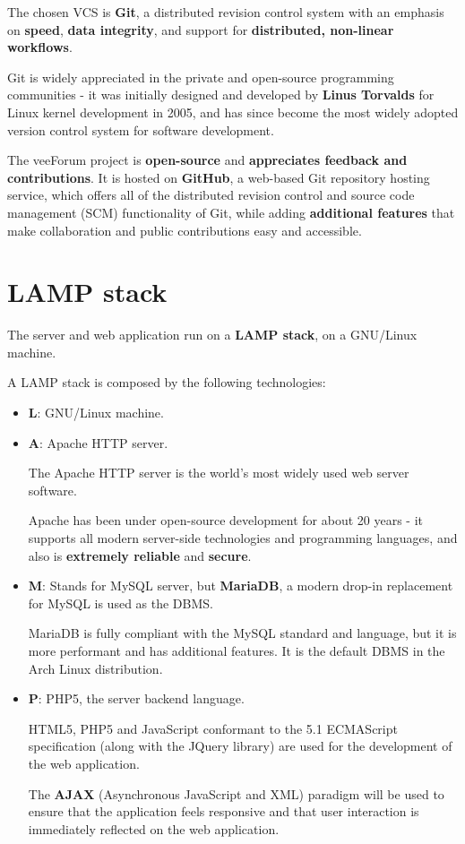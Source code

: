 \documentclass[12pt]{report}
\renewcommand\emph{\textbf}
\begin{document}
                The chosen VCS is \emph{Git}, a distributed revision control system with an emphasis on \emph{speed}, \emph{data integrity}, and support for \emph{distributed, non-linear workflows}.

                Git is widely appreciated in the private and open-source programming communities - it was initially designed and developed by \emph{Linus Torvalds} for Linux kernel development in 2005, and has since become the most widely adopted version control system for software development.

                The veeForum project is \emph{open-source} and \emph{appreciates feedback and contributions}. It is hosted on \emph{GitHub}, a web-based Git repository hosting service, which offers all of the distributed revision control and source code management (SCM) functionality of Git, while adding \emph{additional features} that make collaboration and public contributions easy and accessible.

            \section{LAMP stack}
                The server and web application run on a \emph{LAMP stack}, on a GNU/Linux machine.

                A LAMP stack is composed by the following technologies:

                \begin{itemize}
                    \item \emph{L}: GNU/Linux machine.
                    \item \emph{A}: Apache HTTP server.

                     The Apache HTTP server is the world's most widely used web server software.

                     Apache has been under open-source development for about 20 years - it supports all modern server-side technologies and programming languages, and also is \emph{extremely reliable} and \emph{secure}.

                    \item \emph{M}: Stands for MySQL server, but \emph{MariaDB}, a modern drop-in replacement for MySQL is used as the DBMS. 

                    MariaDB is fully compliant with the MySQL standard and language, but it is more performant and has additional features. It is the default DBMS in the Arch Linux distribution.

                    \item \emph{P}: PHP5, the server backend language. 

                    HTML5, PHP5 and JavaScript conformant to the 5.1 ECMAScript specification (along with the JQuery library) are used for the development of the web application. 

                    The \emph{AJAX} (Asynchronous JavaScript and XML) paradigm will be used to ensure that the application feels responsive and that user interaction is immediately reflected on the web application.

                \end{itemize}
               
\end{document}
